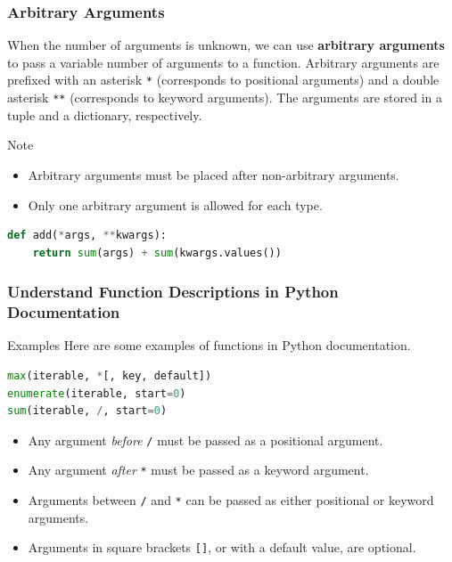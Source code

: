 \documentclass[beamer, en, version=2.0]{huangfusl-template}
\begin{document}
    \begin{frame}[fragile]
        \frametitle{Arbitrary Arguments}

        When the number of arguments is unknown, we can use \textbf{arbitrary arguments} to pass a variable number of arguments to a function. Arbitrary arguments are prefixed with an asterisk {\footnotesize\verb|*|} (corresponds to positional arguments) and a double asterisk {\footnotesize\verb|**|} (corresponds to keyword arguments). The arguments are stored in a tuple and a dictionary, respectively.

        \begin{block}{Note}
            \begin{itemize}
                \item Arbitrary arguments must be placed after non-arbitrary arguments.
                \item Only one arbitrary argument is allowed for each type.
            \end{itemize}
        \end{block}
\begin{lstlisting}[language=python]
def add(*args, **kwargs):
    return sum(args) + sum(kwargs.values())
\end{lstlisting}
    \end{frame}
    \begin{frame}[fragile]
        \frametitle{Understand Function Descriptions in Python Documentation}

        \begin{block}{Examples}
            Here are some examples of functions in Python documentation.
\begin{lstlisting}[language=python]
max(iterable, *[, key, default])
enumerate(iterable, start=0)
sum(iterable, /, start=0)
\end{lstlisting}
        \end{block}

        \begin{itemize}
            \item Any argument \textit{before} {\footnotesize\verb|/|} must be passed as a positional argument.
            \item Any argument \textit{after} {\footnotesize\verb|*|} must be passed as a keyword argument.
            \item Arguments between {\footnotesize\verb|/|} and {\footnotesize\verb|*|} can be passed as either positional or keyword arguments.
            \item Arguments in square brackets {\footnotesize\verb|[]|}, or with a default value, are optional.
        \end{itemize}
    \end{frame}
\end{document}
